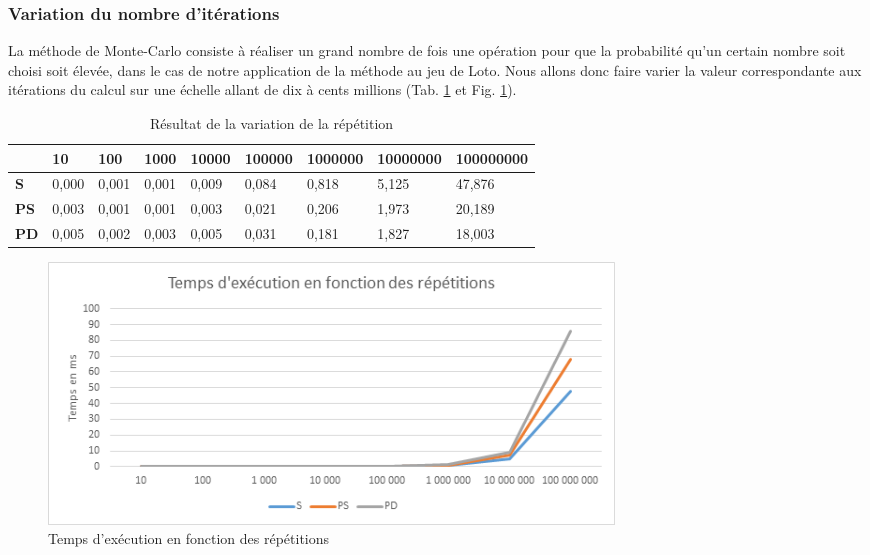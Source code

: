 \documentclass[a4paper,12pt]{article}
\begin{document}
\subsubsection{Variation du nombre d'itérations}
La méthode de Monte-Carlo consiste à réaliser un grand nombre de fois une opération pour que la probabilité qu’un certain nombre soit choisi soit élevée, dans le cas de notre application de la méthode au jeu de Loto. Nous allons donc faire varier la valeur correspondante aux itérations du calcul sur une échelle allant de dix à cents millions (Tab. \ref{tab:tempsexec1} et Fig. \ref{fig:tempsexec1}).\\

\begin{table}[H]
\caption{Résultat de la variation de la répétition}
\label{tab:tempsexec1}
\begin{tabular}{|l|l|l|l|l|l|l|l|l|}
\hline
            & \textbf{10} & \textbf{100} & \textbf{1000} & \textbf{10000} & \textbf{100000} & \textbf{1000000} & \textbf{10000000} & \textbf{100000000} \\ \hline
\textbf{S}  & 0,000       & 0,001        & 0,001          & 0,009           & 0,084           & 0,818              & 5,125               & 47,876               \\ \hline
\textbf{PS} & 0,003       & 0,001        & 0,001          & 0,003           & 0,021           & 0,206              & 1,973               & 20,189               \\ \hline
\textbf{PD} & 0,005       & 0,002        & 0,003          & 0,005           & 0,031           & 0,181              & 1,827               & 18,003               \\ \hline
\end{tabular}
\end{table}

\begin{figure}[H]
\center \includegraphics[width=15cm]{exec1}
\caption{Temps d'exécution en fonction des répétitions}
\label{fig:tempsexec1}
\end{figure}
\end{document}
